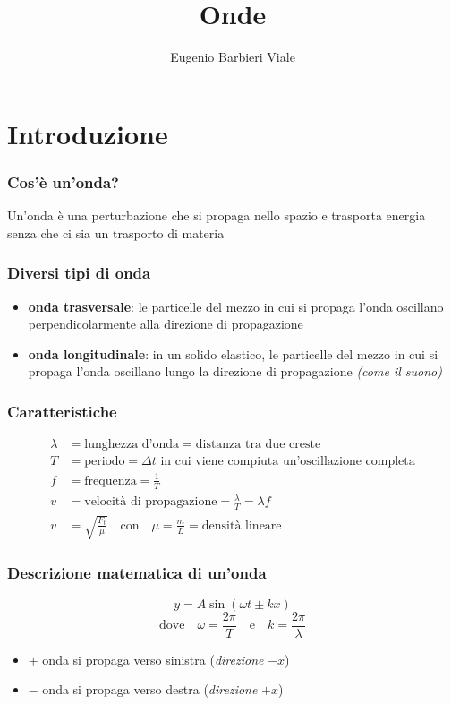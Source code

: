 \documentclass{article}
\title{Onde}
\author{Eugenio Barbieri Viale}
\begin{document}
\setlength{\parindent}{0pt}
\maketitle

\section*{Introduzione}
\subsubsection*{Cos'è un'onda?}
Un'onda è una perturbazione che si propaga nello spazio e trasporta energia senza che ci sia un trasporto di materia

\subsubsection*{Diversi tipi di onda}
\begin{itemize}
    \item \textbf{onda trasversale}: le particelle del mezzo in cui si propaga l'onda oscillano perpendicolarmente alla direzione di propagazione
    \item \textbf{onda longitudinale}: in un solido elastico, le particelle del mezzo in cui si propaga l'onda oscillano lungo la direzione di propagazione \textit{(come il suono)}
\end{itemize}

\subsubsection*{Caratteristiche}
\begin{align*}
    \lambda &= \text{lunghezza d'onda} = \text{distanza tra due creste} \\
    T &= \text{periodo} = \text{$\Delta t$ in cui viene compiuta un'oscillazione completa} \\
    f &= \text{frequenza} = \frac{1}{T} \\
    v &= \text{velocità di propagazione} = \frac{\lambda}{T} = \lambda f \\
    v &= \sqrt{\frac{F_t}{\mu}} \hspace{1em} \text{con} \hspace{1em} \mu = \frac{m}{L} = \text{densità lineare}
\end{align*}

\subsubsection*{Descrizione matematica di un'onda}
$$ y = A \sin{\left(\omega t \pm kx\right)} $$
$$ \text{dove} \hspace{1em} \omega = \frac{2\pi}{T} \hspace{1em} \text{e} \hspace{1em} k = \frac{2\pi}{\lambda} $$
\begin{itemize}
    \item \textbf{$+$} onda si propaga verso sinistra (\textit{direzione} $-x$)
    \item \textbf{$-$} onda si propaga verso destra (\textit{direzione} $+x$)
\end{itemize}
\end{document}
